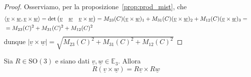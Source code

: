 \begin{proof}
Osserviamo, per la proposizione~\ref{prop:prod_mist}, che
\begin{align*}
&\langle \underline{v} \times \underline{w}, \underline{v} \times \underline{w} \rangle = \text{det}\begin{pmatrix}
\underline{v} & \underline{w} & \underline{v} \times \underline{w}
\end{pmatrix} = M_{23}(C) (\underline{v} \times \underline{w})_1 + M_{31}(C) (\underline{v} \times \underline{w})_2 + M_{12}(C) (\underline{v} \times \underline{w})_3 = \\
&= M_{23}(C)^2 + M_{31}(C)^2 + M_{12}(C)^2
\end{align*}
\noindent dunque $|\underline{v} \times \underline{w}| = \sqrt{M_{23}(C)^2 + M_{31}(C)^2 + M_{12}(C)^2}$
\end{proof}
\begin{prop}
Sia $R \in \text{SO}(3)$ e siano dati $\underline{v}, \underline{w} \in \mathbb{E}_3$. Allora
\begin{equation}
R(\underline{v} \times \underline{w}) = R\underline{v} \times R\underline{w}
\end{equation}
\end{prop}

